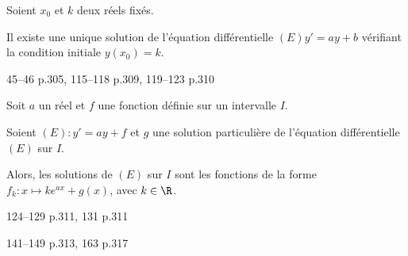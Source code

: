 \documentclass[a4paper]{article}
\begin{document}
    \begin{theoreme*}{}{}
      Soient $x_0$ et $k$ deux réels fixés.

      Il existe une unique solution de l'équation différentielle $(E) y'=ay+b$ vérifiant la condition initiale $y(x_0)=k$.
    \end{theoreme*}

    \begin{exercices}{}{}
   45--46 p.305, 115--118 p.309, 119--123 p.310
    \end{exercices}


    \begin{theoremeadm*}{}{}
      Soit $a$ un réel et $f$ une fonction définie sur un intervalle $I$.

      Soient $(E):y'=ay+f$ et $g$ une solution particulière de l'équation différentielle $(E)$ sur $I$.

      Alors, les solutions de $(E)$ sur $I$ sont les fonctions de la forme $f_k : x\longmapsto ke^{ax}+g(x)$, avec $k\in\R$.
    \end{theoremeadm*}

    \begin{exercices}{}{}
      124--129 p.311, 131 p.311
      \end{exercices}
      \begin{exercices}{}{}
      141--149 p.313, 163 p.317
      \end{exercices}
\end{document}
